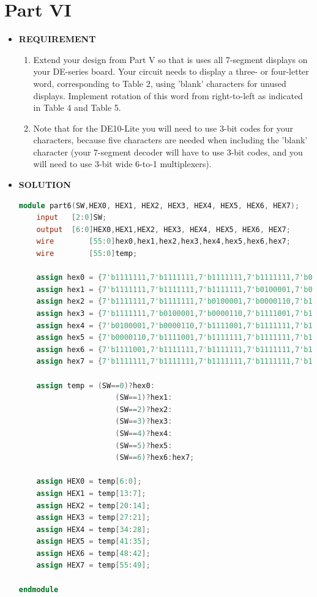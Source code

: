 \section{Part VI }
\begin{itemize}
    \item [] \textbf{REQUIREMENT}
        \begin{enumerate}
            \item Extend your design from Part V so that is uses all 7-segment displays on your DE-series board. Your circuit needs to display a three- or four-letter word, corresponding to Table 2, using 'blank' characters for unused displays. Implement rotation of this word from right-to-left as indicated in Table 4 and Table 5. 
            \item Note that for the DE10-Lite you will need to use 3-bit codes for your characters, because five characters are needed when including the 'blank' character (your 7-segment decoder will have to use 3-bit codes, and you will need to use 3-bit wide 6-to-1 multiplexers). 
        \end{enumerate}
    \item [] \textbf{SOLUTION}
        \begin{lstlisting}[language=Verilog]
module part6(SW,HEX0, HEX1, HEX2, HEX3, HEX4, HEX5, HEX6, HEX7);
	input 	[2:0]SW;
	output 	[6:0]HEX0,HEX1,HEX2, HEX3, HEX4, HEX5, HEX6, HEX7;
	wire		[55:0]hex0,hex1,hex2,hex3,hex4,hex5,hex6,hex7;
	wire		[55:0]temp;

	assign hex0 = {7'b1111111,7'b1111111,7'b1111111,7'b1111111,7'b0100001,7'b0000110,7'b1111001,7'b1111111};
	assign hex1 = {7'b1111111,7'b1111111,7'b1111111,7'b0100001,7'b0000110,7'b1111001,7'b1111111,7'b1111111};
	assign hex2 = {7'b1111111,7'b1111111,7'b0100001,7'b0000110,7'b1111001,7'b1111111,7'b1111111,7'b1111111};
	assign hex3 = {7'b1111111,7'b0100001,7'b0000110,7'b1111001,7'b1111111,7'b1111111,7'b1111111,7'b1111111};
	assign hex4 = {7'b0100001,7'b0000110,7'b1111001,7'b1111111,7'b1111111,7'b1111111,7'b1111111,7'b1111111};
	assign hex5 = {7'b0000110,7'b1111001,7'b1111111,7'b1111111,7'b1111111,7'b1111111,7'b1111111,7'b0100001};
	assign hex6 = {7'b1111001,7'b1111111,7'b1111111,7'b1111111,7'b1111111,7'b1111111,7'b0100001,7'b0000110};
	assign hex7 = {7'b1111111,7'b1111111,7'b1111111,7'b1111111,7'b1111111,7'b0100001,7'b0000110,7'b1111001};
	
	assign temp = (SW==0)?hex0: 
					  (SW==1)?hex1:
					  (SW==2)?hex2:
					  (SW==3)?hex3:
					  (SW==4)?hex4:
					  (SW==5)?hex5:
					  (SW==6)?hex6:hex7;
					  
	assign HEX0 = temp[6:0];
	assign HEX1 = temp[13:7];
	assign HEX2 = temp[20:14];
	assign HEX3 = temp[27:21];
	assign HEX4 = temp[34:28];
	assign HEX5 = temp[41:35];
	assign HEX6 = temp[48:42];
	assign HEX7 = temp[55:49];
	
endmodule
    \end{lstlisting}
\end{itemize}

